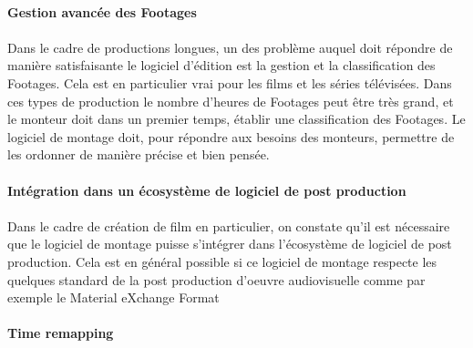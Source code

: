\paragraph{Gestion avancée des Footages}

\paragraph{}

Dans le cadre de productions longues, un des problème auquel doit
répondre de manière satisfaisante le logiciel d'édition est la gestion
et la classification des Footages. Cela est en particulier vrai pour
les films et les séries télévisées.  Dans ces types de production le
nombre d'heures de Footages peut être très grand, et le monteur doit
dans un premier temps, établir une classification des Footages. Le
logiciel de montage doit, pour répondre aux besoins des monteurs,
permettre de les ordonner de manière précise et bien pensée.

\paragraph{Intégration dans un écosystème de logiciel de post
production}

\paragraph{}

Dans le cadre de création de film en particulier, on constate qu'il
est nécessaire que le logiciel de montage puisse s'intégrer dans
l'écosystème de logiciel de post production. Cela est en général
possible si ce logiciel de montage respecte les quelques standard de
la post production d'oeuvre audiovisuelle comme par exemple le Material
eXchange Format  

\paragraph{Time remapping}

\paragraph{ }

